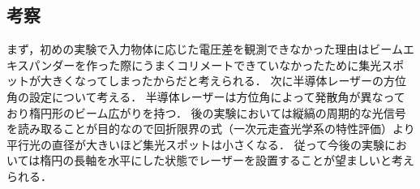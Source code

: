 \documentclass[11pt, a4paper,twocolumn]{jarticle}
\begin{document}
\subsection{考察}
まず，初めの実験で入力物体に応じた電圧差を観測できなかった理由はビームエキスパンダーを作った際にうまくコリメートできていなかったために集光スポットが大きくなってしまったからだと考えられる．
次に半導体レーザーの方位角の設定について考える．
半導体レーザーは方位角によって発散角が異なっており楕円形のビーム広がりを持つ．
後の実験においては縦縞の周期的な光信号を読み取ることが目的なので回折限界の式（一次元走査光学系の特性評価）より平行光の直径が大きいほど集光スポットは小さくなる．
従って今後の実験においては楕円の長軸を水平にした状態でレーザーを設置することが望ましいと考えられる．


\newpage
\end{document}
